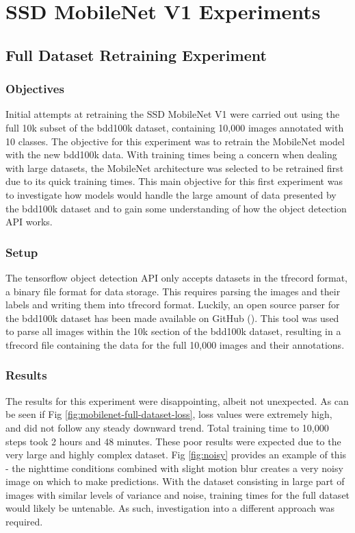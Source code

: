 \documentclass[12pt]{report}
\begin{document}
\section{SSD MobileNet V1 Experiments}
\subsection{Full Dataset Retraining Experiment}
\subsubsection{Objectives}
\begin{flushleft}
Initial attempts at retraining the SSD MobileNet V1 were carried out using the full 10k subset of the bdd100k dataset, containing 10,000 images annotated with 10 classes. The objective for this experiment was to retrain the MobileNet model with the new bdd100k data. With training times being a concern when dealing with large datasets, the MobileNet architecture was selected to be retrained first due to its quick training times. This main objective for this first experiment was to investigate how models would handle the large amount of data presented by the bdd100k dataset and to gain some understanding of how the object detection API works. 
\end{flushleft}

\subsubsection{Setup}
\begin{flushleft}
The tensorflow object detection API only accepts datasets in the tfrecord format, a binary file format for data storage. This requires parsing the images and their labels and writing them into tfrecord format. Luckily, an open source parser for the bdd100k dataset has been made available on GitHub (\cite{parser}). This tool was used to parse all images within the 10k section of the bdd100k dataset, resulting in a tfrecord file containing the data for the full 10,000 images and their annotations.
\end{flushleft}

\subsubsection{Results}
\begin{flushleft}
The results for this experiment were disappointing, albeit not unexpected. As can be seen if Fig \ref{fig:mobilenet-full-dataset-loss}, loss values were extremely high, and did not follow any steady downward trend. Total training time to 10,000 steps took 2 hours and 48 minutes. These poor results were expected due to the very large and highly complex dataset. Fig \ref{fig:noisy} provides an example of this - the nighttime conditions combined with slight motion blur creates a very noisy image on which to make predictions. With the dataset consisting in large part of images with similar levels of variance and noise, training times for the full dataset would likely be untenable. As such, investigation into a different approach was required.
\end{flushleft}
\end{document}

